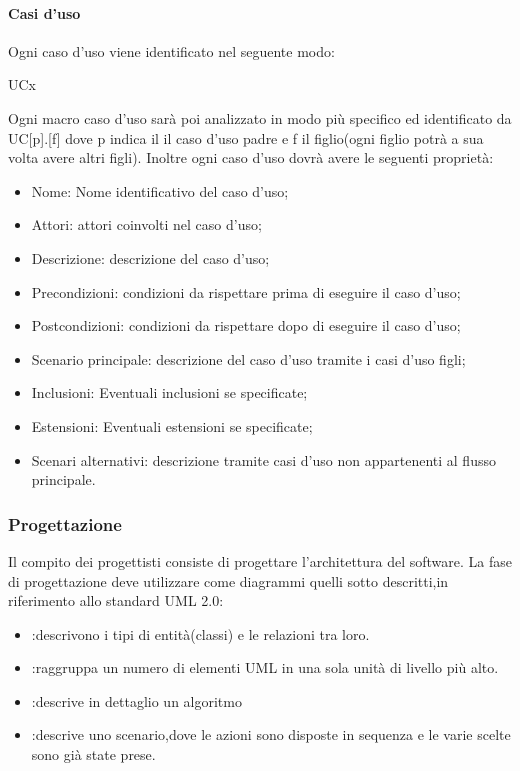 		\paragraph{Casi d'uso}
		Ogni caso d'uso viene identificato nel seguente modo:
		\centerline{UCx}
		Ogni macro caso d'uso sarà poi analizzato in modo più specifico ed identificato da UC[p].[f] dove p indica il il caso d'uso padre e f il figlio(ogni figlio potrà a sua volta avere altri figli).
		Inoltre ogni caso d'uso dovrà avere le seguenti proprietà:
		\begin{itemize}
		\item Nome: Nome identificativo del caso d'uso;
		\item Attori: attori coinvolti nel caso d'uso;
		\item Descrizione: descrizione del caso d'uso;
		\item Precondizioni: condizioni da rispettare prima di eseguire il caso d'uso;%
		\item Postcondizioni: condizioni da rispettare dopo di eseguire il caso d'uso;%
		\item Scenario principale: descrizione del caso d'uso tramite i casi d'uso figli;
		\item Inclusioni: Eventuali inclusioni se specificate;
		\item Estensioni: Eventuali estensioni se specificate;
		\item Scenari alternativi: descrizione tramite casi d'uso non appartenenti al flusso principale.
		\end{itemize}
	\subsubsection{Progettazione}
	Il compito dei progettisti consiste di progettare l'architettura del software. %
	La fase di progettazione deve utilizzare come diagrammi  quelli sotto descritti,in riferimento allo standard UML 2.0:
	\begin{itemize}
		\item {}:descrivono i tipi di entità(classi) e le relazioni tra loro.
		\item {}:raggruppa un numero di elementi UML in una sola unità di livello più alto.
		\item {}:descrive in dettaglio un algoritmo
		\item {}:descrive uno scenario,dove le azioni sono disposte in sequenza e le varie scelte sono già state prese.
		\end{itemize}
